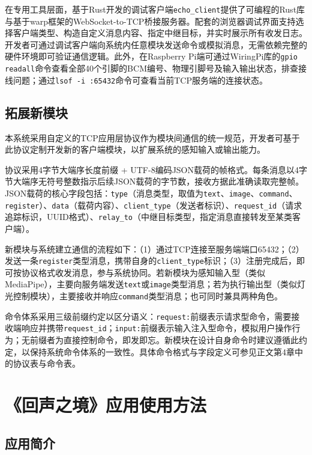 \documentclass[bachelor]{njupthesis}
\begin{document}
在专用工具层面，基于Rust开发的调试客户端\texttt{echo\_client}提供了可编程的Rust库与基于warp框架的WebSocket-to-TCP桥接服务器。配套的浏览器调试界面支持选择客户端类型、构造自定义消息内容、指定中继目标，并实时展示所有收发日志。开发者可通过调试客户端向系统内任意模块发送命令或模拟消息，无需依赖完整的硬件环境即可验证通信逻辑。此外，在Raspberry Pi端可通过WiringPi库的\texttt{gpio readall}命令查看全部40个引脚的BCM编号、物理引脚号及输入输出状态，排查接线问题；通过\texttt{lsof -i :65432}命令可查看当前TCP服务端的连接状态。

\subsection{拓展新模块}

本系统采用自定义的TCP应用层协议作为模块间通信的统一规范，开发者可基于此协议定制开发新的客户端模块，以扩展系统的感知输入或输出能力。

协议采用4字节大端序长度前缀 + UTF-8编码JSON载荷的帧格式。每条消息以4字节大端序无符号整数指示后续JSON载荷的字节数，接收方据此准确读取完整帧。JSON载荷的核心字段包括：\texttt{type}（消息类型，取值为\texttt{text}、\texttt{image}、\texttt{command}、\texttt{register}）、\texttt{data}（载荷内容）、\texttt{client\_type}（发送者标识）、\texttt{request\_id}（请求追踪标识，UUID格式）、\texttt{relay\_to}（中继目标类型，指定消息直接转发至某类客户端）。

新模块与系统建立通信的流程如下：（1）通过TCP连接至服务端端口65432；（2）发送一条\texttt{register}类型消息，携带自身的\texttt{client\_type}标识；（3）注册完成后，即可按协议格式收发消息，参与系统协同。若新模块为感知输入型（类似MediaPipe），主要向服务端发送\texttt{text}或\texttt{image}类型消息；若为执行输出型（类似灯光控制模块），主要接收并响应\texttt{command}类型消息；也可同时兼具两种角色。

命令体系采用三级前缀约定以区分语义：\texttt{request:}前缀表示请求型命令，需要接收端响应并携带\texttt{request\_id}；\texttt{input:}前缀表示输入注入型命令，模拟用户操作行为；无前缀者为直接控制命令，即发即忘。新模块在设计自身命令时建议遵循此约定，以保持系统命令体系的一致性。具体命令格式与字段定义可参见正文第4章中的协议表与命令表。

\section{《回声之境》应用使用方法}

\subsection{应用简介}
\end{document}
